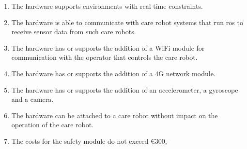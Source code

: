 \documentclass[12pt]{scrreprt}
\begin{document}
\begin{enumerate}
    \item The hardware supports environments with real-time constraints. \label{hsOne}
    \item The hardware is able to communicate with care robot systems that run \acrlong{ros} to receive sensor data from such care robots. \label{hsTwo}
    \item The hardware has or supports the addition of a WiFi module for communication with the operator that controls the care robot. \label{hsThree}
    \item The hardware has or supports the addition of a 4G network module. \label{hsFour}
    \item The hardware has or supports the addition of an accelerometer, a gyroscope and a camera. \label{hsFive}
    \item The hardware can be attached to a care robot without impact on the operation of the care robot. \label{hsSix}
    \item The costs for the safety module do not exceed €300,- \label{hsSeven}
\end{enumerate}
\end{document}
